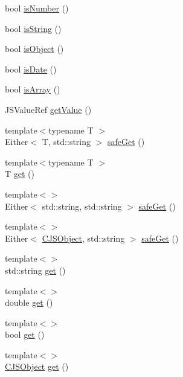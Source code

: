 \begin{DoxyCompactItemize}
\item 
bool \mbox{\hyperlink{classcpp__javascriptcore_1_1_c_j_s_value_ad0c5a43d868ca52a4cc1971b14865493}{is\+Number}} ()
\item 
bool \mbox{\hyperlink{classcpp__javascriptcore_1_1_c_j_s_value_a6989525a037fc132e1f25cb6eb1801cf}{is\+String}} ()
\item 
bool \mbox{\hyperlink{classcpp__javascriptcore_1_1_c_j_s_value_a93391bae4b1cd3d9a33eedb9cda535bd}{is\+Object}} ()
\item 
bool \mbox{\hyperlink{classcpp__javascriptcore_1_1_c_j_s_value_a4cfeaa2e41c526323ce78604f542a12f}{is\+Date}} ()
\item 
bool \mbox{\hyperlink{classcpp__javascriptcore_1_1_c_j_s_value_ae8bf26df8482440d666c34eec43bb906}{is\+Array}} ()
\item 
J\+S\+Value\+Ref \mbox{\hyperlink{classcpp__javascriptcore_1_1_c_j_s_value_a63adc9941be4f4feca788f4991f4de5f}{get\+Value}} ()
\item 
{\footnotesize template$<$typename T $>$ }\\Either$<$ T, std\+::string $>$ \mbox{\hyperlink{classcpp__javascriptcore_1_1_c_j_s_value_ad8f21a7f144c5cae60f5321886205a53}{safe\+Get}} ()
\item 
{\footnotesize template$<$typename T $>$ }\\T \mbox{\hyperlink{classcpp__javascriptcore_1_1_c_j_s_value_ab67e0b43d1680952e0c69d1c7213f38b}{get}} ()
\item 
{\footnotesize template$<$$>$ }\\Either$<$ std\+::string, std\+::string $>$ \mbox{\hyperlink{classcpp__javascriptcore_1_1_c_j_s_value_aec13dfb32f8c39036aedc068037fc2a6}{safe\+Get}} ()
\item 
{\footnotesize template$<$$>$ }\\Either$<$ \mbox{\hyperlink{classcpp__javascriptcore_1_1_c_j_s_object}{C\+J\+S\+Object}}, std\+::string $>$ \mbox{\hyperlink{classcpp__javascriptcore_1_1_c_j_s_value_a66dc7d40bba42c44343ba034edfd422f}{safe\+Get}} ()
\item 
{\footnotesize template$<$$>$ }\\std\+::string \mbox{\hyperlink{classcpp__javascriptcore_1_1_c_j_s_value_a1e6651bf73552b5ecaa4b32bd862d17f}{get}} ()
\item 
{\footnotesize template$<$$>$ }\\double \mbox{\hyperlink{classcpp__javascriptcore_1_1_c_j_s_value_ad999763be3b7631e403ae49f34b2f5e8}{get}} ()
\item 
{\footnotesize template$<$$>$ }\\bool \mbox{\hyperlink{classcpp__javascriptcore_1_1_c_j_s_value_a7cd68361f0f2f0b25c0c7caa2074fd64}{get}} ()
\item 
{\footnotesize template$<$$>$ }\\\mbox{\hyperlink{classcpp__javascriptcore_1_1_c_j_s_object}{C\+J\+S\+Object}} \mbox{\hyperlink{classcpp__javascriptcore_1_1_c_j_s_value_a9d120d1c744e2a77927e0e76671e1b30}{get}} ()
\end{DoxyCompactItemize}


